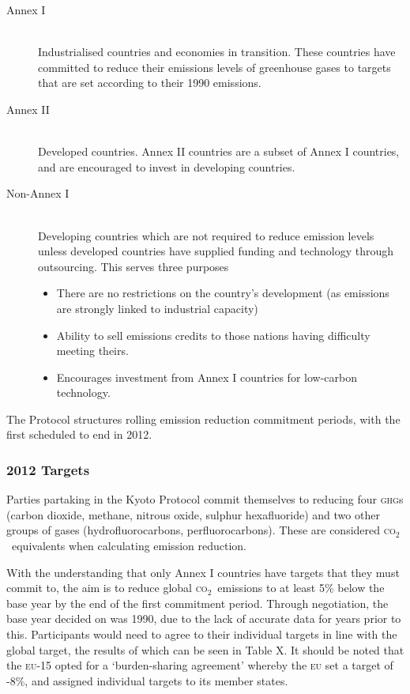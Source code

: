 \documentclass[]{article} %
\newcommand{\CO}{\textsc{co}$_2$~}
\begin{document}
\begin{description}
	\item[Annex I] \hfill \\
	Industrialised countries and economies in transition. These countries have committed to reduce their emissions levels of greenhouse gases to targets that are set according to their 1990 emissions.
	
	\item[Annex II] \hfill \\
	Developed countries. Annex II countries are a subset of Annex I countries, and are encouraged to invest in developing countries.

	\item[Non-Annex I] \hfill \\
	Developing countries which are not required to reduce emission levels unless developed countries have supplied funding and technology through outsourcing. This serves three purposes
	\begin{itemize}
		\item There are no restrictions on the country’s development (as emissions are strongly linked to industrial capacity)
		\item Ability to sell emissions credits to those nations having difficulty meeting theirs.
		\item Encourages investment from Annex I countries for low-carbon technology.
	\end{itemize}
\end{description}

The Protocol structures rolling emission reduction commitment periods, with the first scheduled to end in 2012.

\subsubsection{2012 Targets}

Parties partaking in the Kyoto Protocol commit themselves to reducing four \textsc{ghg}s (carbon dioxide, methane, nitrous oxide, sulphur hexafluoride) and two other groups of gases (hydrofluorocarbons, perfluorocarbons). These are considered \CO equivalents when  calculating emission reduction.

With the understanding that only Annex I countries have targets that they must commit to, the aim is to reduce global \CO emissions to at least 5\% below the base year by the end of the first commitment period. Through negotiation, the base year decided on was 1990, due to the lack of accurate data for years prior to this. Participants would need to agree to their individual targets in line with the global target, the results of which can be seen in Table X. It should be noted that the \textsc{eu}-15 opted for a ‘burden-sharing agreement’ whereby the \textsc{eu} set a target of -8\%, and assigned individual targets to its member states.
\end{document}
